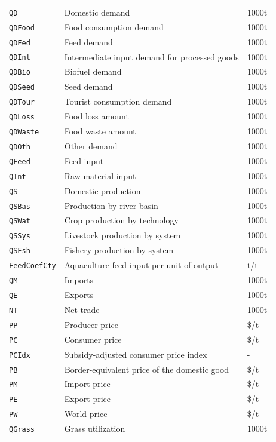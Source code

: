 \begin{xltabular}{\linewidth}{l X l}
  \texttt{QD} & Domestic demand & 1000t \\
  \texttt{QDFood} & Food consumption demand & 1000t \\
  \texttt{QDFed} & Feed demand & 1000t \\
  \texttt{QDInt} & Intermediate input demand for processed goods & 1000t \\
  \texttt{QDBio} & Biofuel demand & 1000t \\
  \texttt{QDSeed} & Seed demand & 1000t \\
  \texttt{QDTour} & Tourist consumption demand & 1000t \\
  \texttt{QDLoss} & Food loss amount & 1000t \\
  \texttt{QDWaste} & Food waste amount & 1000t \\
  \texttt{QDOth} & Other demand & 1000t \\
  \texttt{QFeed} & Feed input & 1000t \\
  \texttt{QInt} & Raw material input & 1000t \\
  \texttt{QS} & Domestic production & 1000t \\
  \texttt{QSBas} & Production by river basin & 1000t \\
  \texttt{QSWat} & Crop production by technology & 1000t \\
  \texttt{QSSys} & Livestock production by system & 1000t \\
  \texttt{QSFsh} & Fishery production by system & 1000t \\
  \texttt{FeedCoefCty} & Aquaculture feed input per unit of output & t/t \\
  \texttt{QM} & Imports & 1000t \\
  \texttt{QE} & Exports & 1000t \\
  \texttt{NT} & Net trade & 1000t \\
  \texttt{PP} & Producer price & \$/t \\
  \texttt{PC} & Consumer price & \$/t \\
  \texttt{PCIdx} & Subsidy-adjusted consumer price index & - \\
  \texttt{PB} & Border-equivalent price of the domestic good & \$/t \\
  \texttt{PM} & Import price & \$/t \\
  \texttt{PE} & Export price & \$/t \\
  \texttt{PW} & World price & \$/t \\
  \texttt{QGrass} & Grass utilization & 1000t \\

\end{xltabular}
